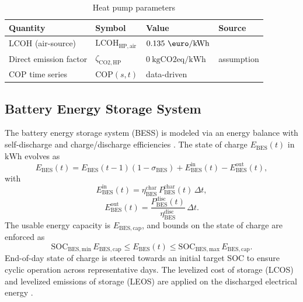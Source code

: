 \documentclass[12pt,a4paper]{report}
\begin{document}
\begin{table}[H]
\centering
\caption{Heat pump parameters}
\label{tab:heat_pump_parameters}
\begin{tabular}{llll}
\hline
Quantity & Symbol & Value & Source \\
\hline
LCOH (air-source) & \(\mathrm{LCOH}_{\mathrm{HP,air}}\) & \(0.135~\mathrm{\text{\euro}/kWh}\) & \cite{EC2020_LCOE} \\
Direct emission factor & \(\zeta_{\mathrm{CO2,HP}}\) & \(0~\mathrm{kgCO2eq/kWh}\) & assumption \\
COP time series & \(\mathrm{COP}(s,t)\) & data-driven & \cite{ruhnau_when2heat_2019} \\
\hline
\end{tabular}
\end{table}

\subsection{Battery Energy Storage System}
\label{subsec:bess}

The battery energy storage system (BESS) is modeled via an energy balance with self-discharge and charge/discharge efficiencies \cite{HE2023113476,CRISTEA2022102633,liion_env_impact}. The state of charge \(E_{\mathrm{BES}}(t)\) in \(\mathrm{kWh}\) evolves as
\begin{equation}
E_{\mathrm{BES}}(t)
= E_{\mathrm{BES}}(t-1)\left(1-\sigma_{\mathrm{BES}}\right)
+ E_{\mathrm{BES}}^{\mathrm{in}}(t)
- E_{\mathrm{BES}}^{\mathrm{out}}(t),
\label{eq:bess_energy_balance}
\end{equation}
with
\begin{equation}
E_{\mathrm{BES}}^{\mathrm{in}}(t)=\eta_{\mathrm{BES}}^{\mathrm{char}}\,P_{\mathrm{BES}}^{\mathrm{char}}(t)\,\Delta t,
\label{eq:bess_input_energy}
\end{equation}
\begin{equation}
E_{\mathrm{BES}}^{\mathrm{out}}(t)=\frac{P_{\mathrm{BES}}^{\mathrm{disc}}(t)}{\eta_{\mathrm{BES}}^{\mathrm{disc}}}\,\Delta t.
\label{eq:bess_output_energy}
\end{equation}
The usable energy capacity is \(E_{\mathrm{BES,cap}}\), and bounds on the state of charge are enforced as
\begin{equation}
\mathrm{SOC}_{\mathrm{BES,min}}\,E_{\mathrm{BES,cap}}
\leq E_{\mathrm{BES}}(t)
\leq \mathrm{SOC}_{\mathrm{BES,max}}\,E_{\mathrm{BES,cap}}.
\label{eq:bess_soc_bounds}
\end{equation}
End-of-day state of charge is steered towards an initial target SOC to ensure cyclic operation across representative days. The levelized cost of storage (LCOS) and levelized emissions of storage (LEOS) are applied on the discharged electrical energy \cite{CRISTEA2022102633,BESSLEOS}.  
\end{document}
